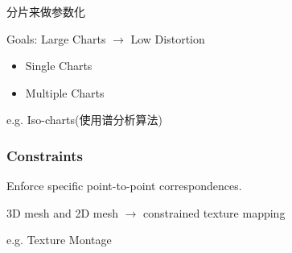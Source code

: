 分片来做参数化

Goals: Large Charts $\to$ Low Distortion

\begin{itemize}
    \item Single Charts
    \item Multiple Charts
\end{itemize}

e.g. Iso-charts(使用谱分析算法)

\subsubsection{Constraints}
Enforce specific point-to-point correspondences. 

3D mesh and 2D mesh $\to$ constrained texture mapping

e.g. Texture Montage